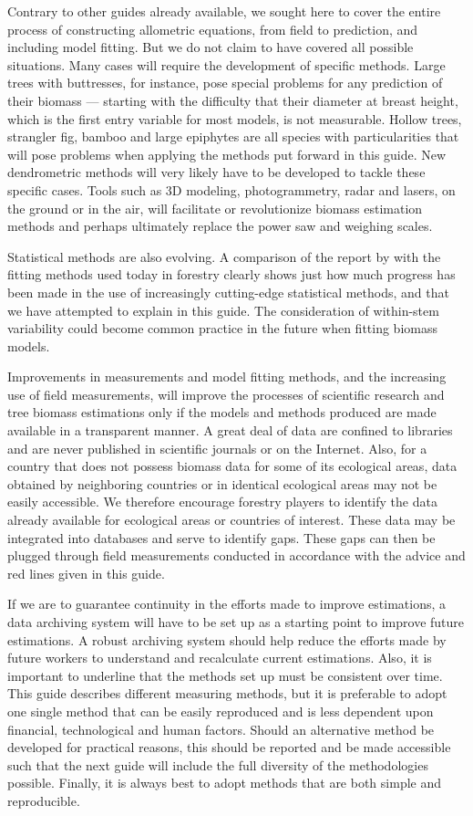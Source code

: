 Contrary to other guides already available, we sought here to cover the entire process of constructing allometric equations, from field to prediction, and including model fitting. But we do not claim to have covered all possible situations. Many cases will require the development of specific methods. Large trees with buttresses, for instance, pose special problems for any prediction of their biomass --- starting with the difficulty that their diameter at breast height, which is the first entry variable for most models, is not measurable. Hollow trees, strangler fig, bamboo and large epiphytes are all species with particularities that will pose problems when applying the methods put forward in this guide. New dendrometric methods will very likely have to be developed to tackle these specific cases. Tools such as 3D modeling, photogrammetry, radar and lasers, on the ground or in the air, will facilitate or revolutionize biomass estimation methods and perhaps ultimately replace the power saw and weighing scales.

Statistical methods are also evolving. A comparison of the report by \citet{whraton87} with the fitting methods used today in forestry clearly shows just how much progress has been made in the use of increasingly cutting-edge statistical methods, and that we have attempted to explain in this guide. The consideration of within-stem variability could become common practice in the future when fitting biomass models.

Improvements in measurements and model fitting methods, and the increasing use of field measurements, will improve the processes of scientific research and tree biomass estimations only if the models and methods produced are made available in a transparent manner. A great deal of data are confined to libraries and are never published in scientific journals or on the Internet. Also, for a country that does not possess biomass data for some of its ecological areas, data obtained by neighboring countries or in identical ecological areas may not be easily accessible. We therefore encourage forestry players to identify the data already available for ecological areas or countries of interest. These data may be integrated into databases and serve to identify gaps. These gaps can then be plugged through field measurements conducted in accordance with the advice and red lines given in this guide.

If we are to guarantee continuity in the efforts made to improve estimations, a data archiving system will have to be set up as a starting point to improve future estimations. A robust archiving system should help reduce the efforts made by future workers to understand and recalculate current estimations. Also, it is important to underline that the methods set up must be consistent over time. This guide describes different measuring methods, but it is preferable to adopt one single method that can be easily reproduced and is less dependent upon financial, technological and human factors. Should an alternative method be developed for practical reasons, this should be reported and be made accessible such that the next guide will include the full diversity of the methodologies possible. Finally, it is always best to adopt methods that are both simple and reproducible.
